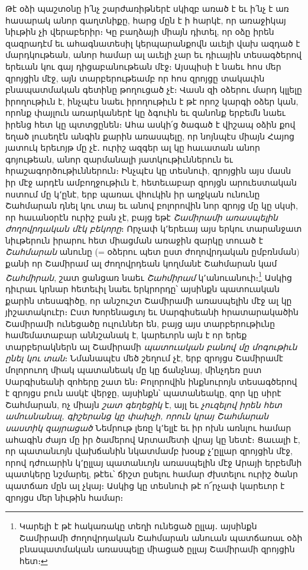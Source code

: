 \documentclass{article}
\begin{document}
{Թէ օձի պաշտօնը ի՛նչ շարժառիթներէ սկիզբ առած է եւ ի՛նչ է առ հասարակ անոր գաղտնիքը, հարց մըն է ի հարկէ, որ առաջիկայ նիւթին չի վերաբերիր։ Կը բաղձայի միայն դիտել, որ օձը իրեն զազրադէմ եւ ահագնատեսիլ կերպարանքովն աւելի վախ ազդած է մարդկութեան, անոր համար ալ աւելի չար եւ դիւային տեսագծերով երեւան կու գայ դիցաբանութեան մէջ։ Այսպիսի է նաեւ հոս մեր զրոյցին մէջ, այն տարբերութեամբ որ հոս զրոյցը տակաւին բնապատմական գետինը թողուցած չէ։ Վասն զի օձերու մարդ կլլելը իրողութիւն է, ինչպէս նաեւ իրողութիւն է թէ որոշ կարգի օձեր կան, որոնք փայլուն առարկաներէ կը ձգուին եւ զանոնք երբեմն նաեւ իրենց հետ կը պտտցընեն։ Ահա ասկի՛ց ծագած է վիշապ օձին քով եղած լուսեղէն անգին քարին առասպելը, որ նոյնպէս միայն Հայոց յատուկ երեւոյթ մը չէ․ ուրիշ ազգեր ալ կը հաւատան անոր գոյութեան, անոր զարմանալի յատկութիւններուն եւ հրաշագործութիւններուն։ Ինչպէս կը տեսնուի, զրոյցին այս մասն իր մէջ արդէն ամբողջութիւն է, հետեւաբար զրոյցն արուեստական ոստում մը կ՚ընէ, երբ պառաւ վհուկին իր աղջկան ունունը Շահմարան դնել կու տայ եւ անով բոլորովին նոր զրոյց մը կը սկսի, որ հաւանօրէն ուրիշ բան չէ, բայց եթէ \emph{Շամիրամի առասպելին ժողովրդական մէկ բեկորը}։ Որչափ կ՚երեւայ այս երկու տարանջատ նիւթերուն իրարու հետ միացման առաջին զարկը տուած է \emph{Շահմարան} անունը (= օձերու պետ ըստ ժողովրդական ըմբռնման) քանի որ Շամիրամ ալ ժողովրդեան կողմանէ Շահմարան կամ \emph{Շահմիրան}, շատ ցանցառ նաեւ \emph{Շահմիրամ} կ՚անուանուի։\footnote{Կարելի է թէ հակառակը տեղի ունեցած ըլլայ․ այսինքն Շամիրամի ժողովրդական Շահմարան անուան պատճառաւ օձի բնապատմական առասպելը միացած ըլլայ Շամիրամի զրոյցին հետ։} Ասկից դիւրաւ կրնար հետեւիլ նաեւ երկրորդը՝ այսինքն պատուական քարին տեսագիծը, որ անշուշտ Շամիրամի առասպելին մէջ ալ կը յիշատակուէր։ Ըստ Խորենացւոյ եւ Սարգիսեանի հրատարակածին Շամիրամի ունեցածը ուլուններ են, բայց այս տարբերութիւնը համեմատաբար աննշանակ է, կարեւորն այն է որ երեք տարբերակներն ալ Շամիրամի \emph{պատուական բանով մը մոգութիւն ընել կու տան}։ Նմանապէս մեծ շեղում չէ, երբ զրոյցս Շամիրամէ մոլորուող միակ պատանեակ մը կը ճանչնայ, մինչդեռ ըստ Սարգիսեանի զոհերը շատ են։ Բոլորովին ինքնուրոյն տեսագծերով է զրոյցս բուն ասկէ վերջը, այսինքն՝ պատանեակը, զոր կը սիրէ Շահմարան, ոչ միայն \emph{շատ գեղեցիկ} է, այլ եւ \emph{չուզելով իրեն հետ ամուսնանալ, գիշերանց կը փախչի, որուն կրայ Շահմարան սաստիկ զայրացած} Նեմրութ լեռը կ՚ելլէ եւ իր ոխն առնլու համար ահագին ժայռ մը իր ծամերով Արտամետի վրայ կը նետէ։ Ցաւալի է, որ պատանւոյն վախճանին նկատմամբ խօսք չ՚ըլլար զրոյցին մէջ, որով դժուարին կ՚ըլլայ պատանւոյն առասպելին մէջ Արայի երբեմնի պատկերը նշմարել, թէեւ՝ ճիշտ ըսելու համար ժխտելու ուրիշ ծանր պատճառ մըն ալ չկայ։ Ասկից կը տեսնուի թէ ո՜րչափ կարեւոր է զրոյցս մեր նիւթին համար։

}
\end{document}
